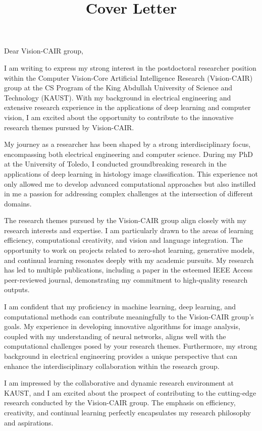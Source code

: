 \documentclass[11pt]{article}
\date{}
\title{Cover Letter}
\begin{document}
\maketitle
\noindent
Dear Vision-CAIR group, 
\indent

I am writing to express my strong interest in the postdoctoral
researcher position within the Computer Vision-Core Artificial
Intelligence Research (Vision-CAIR) group at the CS Program of the
King Abdullah University of Science and Technology (KAUST). With my
background in electrical engineering and extensive research experience
in the applications of deep learning and computer vision, I am excited
about the opportunity to contribute to the innovative research themes
pursued by Vision-CAIR.

My journey as a researcher has been shaped by a strong
interdisciplinary focus, encompassing both electrical engineering and
computer science. During my PhD at the University of Toledo, I
conducted groundbreaking research in the applications of deep learning
in histology image classification. This experience not only allowed me
to develop advanced computational approaches but also instilled in me
a passion for addressing complex challenges at the intersection of
different domains.

The research themes pursued by the Vision-CAIR group align closely
with my research interests and expertise. I am particularly drawn to
the areas of learning efficiency, computational creativity, and vision
and language integration. The opportunity to work on projects related
to zero-shot learning, generative models, and continual learning
resonates deeply with my academic pursuits. My research has led to
multiple publications, including a paper in the esteemed IEEE Access
peer-reviewed journal, demonstrating my commitment to high-quality
research outputs.

I am confident that my proficiency in machine learning, deep learning,
and computational methods can contribute meaningfully to the
Vision-CAIR group's goals. My experience in developing innovative
algorithms for image analysis, coupled with my understanding of neural
networks, aligns well with the computational challenges posed by your
research themes. Furthermore, my strong background in electrical
engineering provides a unique perspective that can enhance the
interdisciplinary collaboration within the research group.

I am impressed by the collaborative and dynamic research environment
at KAUST, and I am excited about the prospect of contributing to the
cutting-edge research conducted by the Vision-CAIR group. The emphasis
on efficiency, creativity, and continual learning perfectly
encapsulates my research philosophy and aspirations.
\end{document}
